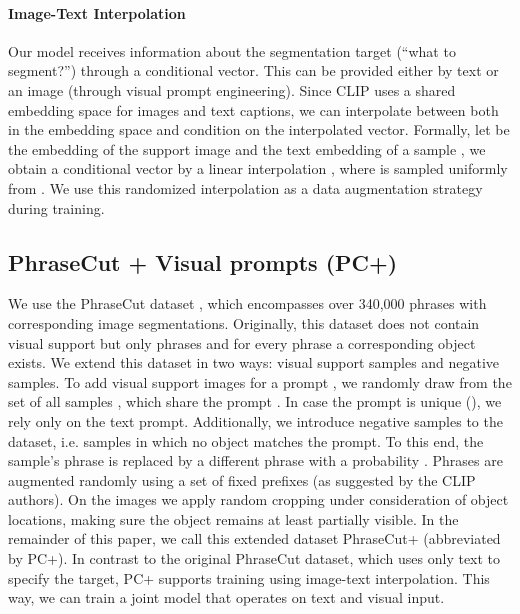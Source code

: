 \documentclass[10pt,twocolumn,letterpaper]{article}
\begin{document}
\paragraph{Image-Text Interpolation}
\label{sec:text_image_interpolation}
Our model receives information about the segmentation target (``what to segment?'') through a conditional vector. This can be provided either by text or an image (through visual prompt engineering). Since CLIP uses a shared embedding space for images and text captions, we can interpolate between both in the embedding space and condition on the interpolated vector.
Formally, let  be the embedding of the support image and  the text embedding of a sample , we obtain a conditional vector  by a linear interpolation , where  is sampled uniformly from . 
We use this randomized interpolation as a data augmentation strategy during training.







\subsection{PhraseCut + Visual prompts (PC+)}

We use the PhraseCut dataset \cite{wu20phrasecut}, which encompasses over 340,000 phrases with corresponding image segmentations.
Originally, this dataset does not contain visual support but only phrases and for every phrase a corresponding object exists. We extend this dataset in two ways: visual support samples and negative samples. 
To add visual support images for a prompt , we randomly draw from the set of all samples , which share the prompt . In case the prompt is unique (), we rely only on the text prompt. 
Additionally, we introduce negative samples to the dataset, i.e. samples in which no object matches the prompt. To this end, the sample's phrase is replaced by a different phrase with a probability .
Phrases are augmented randomly using a set of fixed prefixes (as suggested by the CLIP authors). On the images we apply random cropping under consideration of object locations, making sure the object remains at least partially visible.
In the remainder of this paper, we call this extended dataset PhraseCut+ (abbreviated by PC+). In contrast to the original PhraseCut dataset, which uses only text to specify the target, PC+ supports training using image-text interpolation. This way, we can train a joint model that operates on text and visual input.
\end{document}
